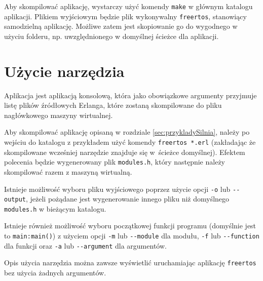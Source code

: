 Aby skompilować aplikację, wystarczy użyć komendy \texttt{make} w głównym katalogu aplikacji. Plikiem wyjściowym będzie plik wykonywalny \texttt{freertos}, stanowiący samodzielną aplikację. Możliwe zatem jest skopiowanie go do wygodnego w użyciu folderu, np. uwzględnionego w domyślnej ścieżce dla aplikacji.

\section{Użycie narzędzia}
\label{sec:builderUzycie}

Aplikacja jest aplikacją konsolową, która jako obowiązkowe argumenty przyjmuje listę plików źródłowych Erlanga, które zostaną skompilowane do pliku nagłówkowego maszyny wirtualnej.

Aby skompilować aplikację opisaną w rozdziale \ref{sec:przykladySilnia}, należy po wejściu do katalogu z przykładem użyć komendy \texttt{freertos *.erl} (zakładając że skompilowane wcześniej narzędzie znajduje się w~ścieżce domyślnej). Efektem polecenia będzie wygenerowany plik \texttt{modules.h}, który następnie należy skompilować razem z maszyną wirtualną.

Istnieje możliwość wyboru pliku wyjściowego poprzez użycie opcji \texttt{-o} lub \texttt{-{}-output}, jeżeli pożądane jest wygenerowanie innego pliku niż domyślnego \texttt{modules.h} w bieżącym katalogu.

Istnieje również możliwość wyboru początkowej funkcji programu (domyślnie jest to \texttt{main:main()}) z użyciem opcji \texttt{-m} lub \texttt{-{}-module} dla modułu, \texttt{-f} lub \texttt{-{}-function} dla funkcji oraz \texttt{-a} lub \texttt{-{}-argument} dla argumentów.

Opis użycia narzędzia można zawsze wyświetlić uruchamiając aplikację \texttt{freertos} bez użycia żadnych argumentów.
